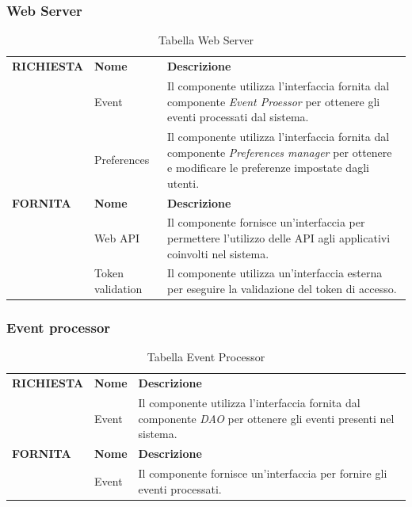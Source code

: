 \documentclass{article}
\begin{document}
\clearpage

\subsubsection{Web Server}

\begin{table}[htbp]
    \centering
    \renewcommand{\arraystretch}{1.3} %
    \begin{tabularx}{\textwidth}{| l | l | X |}
        \Xhline{2pt}
        \textbf{RICHIESTA} & \textbf{Nome} & \textbf{Descrizione} \\
        \Xhline{2pt}
         & Event & Il componente utilizza l'interfaccia fornita dal componente \textit{Event Proessor} per ottenere gli eventi processati dal sistema. \\
        \hline
         & Preferences & Il componente utilizza l'interfaccia fornita dal componente \textit{Preferences manager} per ottenere e modificare le preferenze impostate dagli utenti. \\
        \Xhline{2pt}
        \textbf{FORNITA} & \textbf{Nome} & \textbf{Descrizione} \\
        \Xhline{2pt}
         & Web API & Il componente fornisce un'interfaccia per permettere l'utilizzo delle API agli applicativi coinvolti nel sistema. \\
        \hline
         & Token validation & Il componente utilizza un'interfaccia esterna per eseguire la validazione del token di accesso. \\
        \hline
    \end{tabularx}
    \caption{Tabella Web Server}
\end{table}

\subsubsection{Event processor}

\begin{table}[htbp]
    \centering
    \renewcommand{\arraystretch}{1.3} %
    \begin{tabularx}{\textwidth}{| l | l | X |}
        \Xhline{2pt}
        \textbf{RICHIESTA} & \textbf{Nome} & \textbf{Descrizione} \\
        \Xhline{2pt}
         & Event & Il componente utilizza l'interfaccia fornita dal componente \textit{DAO} per ottenere gli eventi presenti nel sistema. \\
        \Xhline{2pt}
        \textbf{FORNITA} & \textbf{Nome} & \textbf{Descrizione} \\
        \Xhline{2pt}
         & Event & Il componente fornisce un'interfaccia per fornire gli eventi processati. \\
        \hline
    \end{tabularx}
    \caption{Tabella Event Processor}
\end{table}
\end{document}
